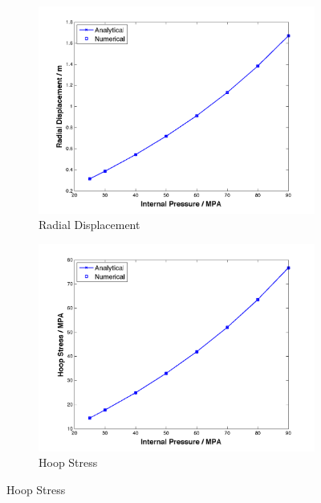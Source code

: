\begin{figure}[t!p]
	\begin{subfigure}[b]{0.5\textwidth}
		\centering
		\includegraphics[width=\textwidth]{./figures/ur.png}
		\caption{Radial Displacement}
		\label{ur}
	\end{subfigure}
	\begin{subfigure}[b]{0.5\textwidth}
		\centering
		\includegraphics[width=\textwidth]{./figures/hoop.png}
		\caption{Hoop Stress}
		\label{hoop}
	\end{subfigure}
	

\end{figure}
